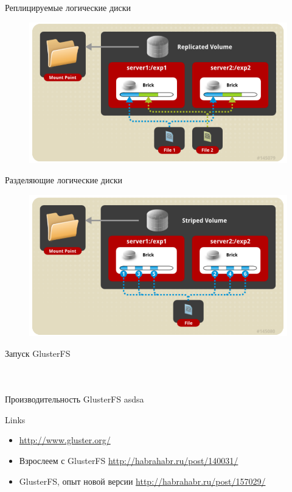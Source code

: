 \documentclass{beamer}
\begin{document}
\begin{frame}{Реплицируемые логические диски}
	\begin{figure}[h]
		\centering
		\includegraphics[width=0.8\linewidth]{replicated.png}
	\end{figure}
\end{frame}

\begin{frame}{Разделяющие логические диски}
	\begin{figure}[h]
		\centering
		\includegraphics[width=0.8\linewidth]{striped.png}
	\end{figure}
\end{frame}

\begin{frame}{Запуск GlusterFS}
	\inputminted{bash}{sc2}
	\pause
	\inputminted{bash}{sc1}
	\pause
	\inputminted{bash}{sc3}
\end{frame}

\begin{frame}{Производительность GlusterFS}
	asdsa
\end{frame}

\begin{frame}{Links}
	\begin{itemize}
		\item \url{http://www.gluster.org/}
		\item Взрослеем с GlusterFS \url{http://habrahabr.ru/post/140031/}
		\item GlusterFS, опыт новой версии \url{http://habrahabr.ru/post/157029/}
	\end{itemize}
\end{frame}
\end{document}
